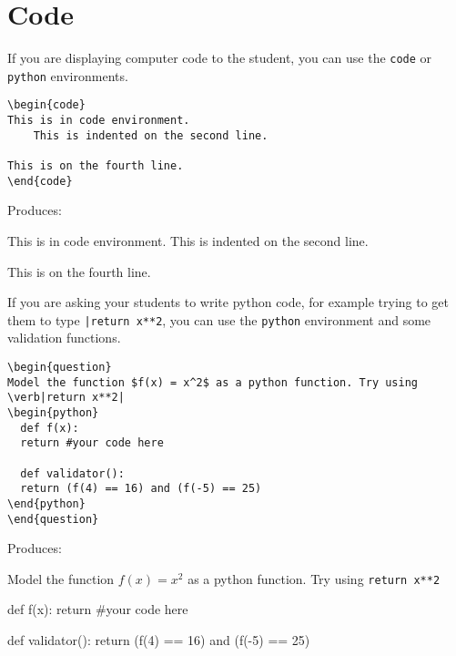 \documentclass{ximera}
\begin{document}
\section{Code} \label{CodeAnswers}

\begin{example}
If you are displaying computer code to the student, you can use the \verb!code! or \verb!python! environments.

\begin{verbatim}
\begin{code}
This is in code environment.
    This is indented on the second line.

This is on the fourth line.
\end{code}
\end{verbatim}

Produces:

\begin{code}
This is in code environment.
    This is indented on the second line.

This is on the fourth line.
\end{code}
\end{example}

\begin{example}
If you are asking your students to write python code, for example trying to get them to type \verb!|return x**2!, you can use the \verb!python! environment and some validation functions.

\begin{verbatim}
\begin{question}
Model the function $f(x) = x^2$ as a python function. Try using \verb|return x**2|
\begin{python}
  def f(x):
  return #your code here

  def validator():
  return (f(4) == 16) and (f(-5) == 25)
\end{python}
\end{question}
\end{verbatim}

Produces:

\begin{question}
Model the function $f(x) = x^2$ as a python function. Try using \verb|return x**2|
\begin{python}
  def f(x):
  return #your code here

  def validator():
  return (f(4) == 16) and (f(-5) == 25)
\end{python}
\end{question}
\end{example}
\end{document}
